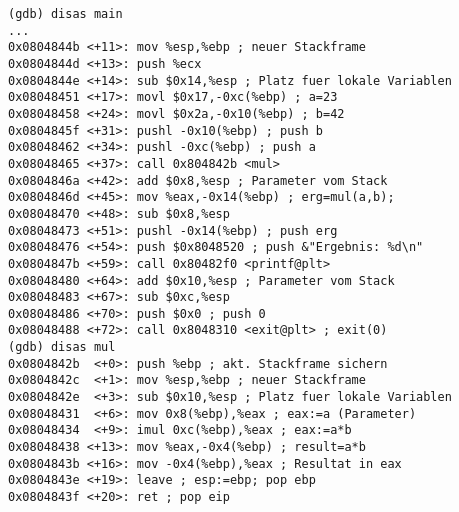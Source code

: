 \begin{lstlisting}[language={[x86masm]Assembler}]
(gdb) disas main
...
0x0804844b <+11>: mov %esp,%ebp ; neuer Stackframe
0x0804844d <+13>: push %ecx
0x0804844e <+14>: sub $0x14,%esp ; Platz fuer lokale Variablen
0x08048451 <+17>: movl $0x17,-0xc(%ebp) ; a=23
0x08048458 <+24>: movl $0x2a,-0x10(%ebp) ; b=42
0x0804845f <+31>: pushl -0x10(%ebp) ; push b
0x08048462 <+34>: pushl -0xc(%ebp) ; push a
0x08048465 <+37>: call 0x804842b <mul>
0x0804846a <+42>: add $0x8,%esp ; Parameter vom Stack
0x0804846d <+45>: mov %eax,-0x14(%ebp) ; erg=mul(a,b);
0x08048470 <+48>: sub $0x8,%esp
0x08048473 <+51>: pushl -0x14(%ebp) ; push erg
0x08048476 <+54>: push $0x8048520 ; push &"Ergebnis: %d\n"
0x0804847b <+59>: call 0x80482f0 <printf@plt>
0x08048480 <+64>: add $0x10,%esp ; Parameter vom Stack
0x08048483 <+67>: sub $0xc,%esp
0x08048486 <+70>: push $0x0 ; push 0
0x08048488 <+72>: call 0x8048310 <exit@plt> ; exit(0)
(gdb) disas mul
0x0804842b 	<+0>: push %ebp ; akt. Stackframe sichern
0x0804842c  <+1>: mov %esp,%ebp ; neuer Stackframe
0x0804842e  <+3>: sub $0x10,%esp ; Platz fuer lokale Variablen
0x08048431  <+6>: mov 0x8(%ebp),%eax ; eax:=a (Parameter)
0x08048434  <+9>: imul 0xc(%ebp),%eax ; eax:=a*b
0x08048438 <+13>: mov %eax,-0x4(%ebp) ; result=a*b
0x0804843b <+16>: mov -0x4(%ebp),%eax ; Resultat in eax
0x0804843e <+19>: leave ; esp:=ebp; pop ebp
0x0804843f <+20>: ret ; pop eip
\end{lstlisting}


